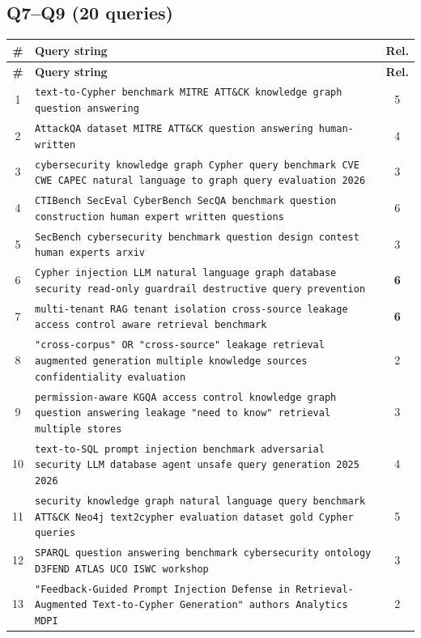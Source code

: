 \documentclass[11pt,a4paper]{article}
\begin{document}
\subsection{Q7--Q9 (20 queries)}

\begin{center}
\footnotesize
\begin{longtable}{@{}c>{\RaggedRight}p{13.6cm}c@{}}
\toprule
\textbf{\#} & \textbf{Query string} & \textbf{Rel.} \\
\midrule
\endfirsthead
\toprule
\textbf{\#} & \textbf{Query string} & \textbf{Rel.} \\
\midrule
\endhead
1 & \texttt{text-to-Cypher benchmark MITRE ATT\&CK knowledge graph question answering} & 5 \\
2 & \texttt{AttackQA dataset MITRE ATT\&CK question answering human-written} & 4 \\
3 & \texttt{cybersecurity knowledge graph Cypher query benchmark CVE CWE CAPEC natural language to graph query evaluation 2026} & 3 \\
4 & \texttt{CTIBench SecEval CyberBench SecQA benchmark question construction human expert written questions} & 6 \\
5 & \texttt{SecBench cybersecurity benchmark question design contest human experts arxiv} & 3 \\
6 & \texttt{Cypher injection LLM natural language graph database security read-only guardrail destructive query prevention} & \textbf{6} \\
7 & \texttt{multi-tenant RAG tenant isolation cross-source leakage access control aware retrieval benchmark} & \textbf{6} \\
8 & \texttt{"cross-corpus" OR "cross-source" leakage retrieval augmented generation multiple knowledge sources confidentiality evaluation} & 2 \\
9 & \texttt{permission-aware KGQA access control knowledge graph question answering leakage "need to know" retrieval multiple stores} & 3 \\
10 & \texttt{text-to-SQL prompt injection benchmark adversarial security LLM database agent unsafe query generation 2025 2026} & 4 \\
11 & \texttt{security knowledge graph natural language query benchmark ATT\&CK Neo4j text2cypher evaluation dataset gold Cypher queries} & 5 \\
12 & \texttt{SPARQL question answering benchmark cybersecurity ontology D3FEND ATLAS UCO ISWC workshop} & 3 \\
13 & \texttt{"Feedback-Guided Prompt Injection Defense in Retrieval-Augmented Text-to-Cypher Generation" authors Analytics MDPI} & 2 \\

\end{longtable}
\end{center}
\end{document}
